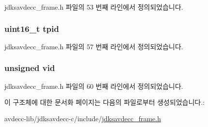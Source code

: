 jdksavdecc\+\_\+frame.\+h 파일의 53 번째 라인에서 정의되었습니다.

\subsubsection[{\texorpdfstring{tpid}{tpid}}]{\setlength{\rightskip}{0pt plus 5cm}uint16\+\_\+t tpid}\hypertarget{structjdksavdecc__frame_a6732d2a618d68a2a54a3be2712852ee9}{}\label{structjdksavdecc__frame_a6732d2a618d68a2a54a3be2712852ee9}


jdksavdecc\+\_\+frame.\+h 파일의 57 번째 라인에서 정의되었습니다.

\subsubsection[{\texorpdfstring{vid}{vid}}]{\setlength{\rightskip}{0pt plus 5cm}unsigned vid}\hypertarget{structjdksavdecc__frame_a139f10af6306ba74259c24567d70c42d}{}\label{structjdksavdecc__frame_a139f10af6306ba74259c24567d70c42d}


jdksavdecc\+\_\+frame.\+h 파일의 60 번째 라인에서 정의되었습니다.



이 구조체에 대한 문서화 페이지는 다음의 파일로부터 생성되었습니다.\+:\begin{DoxyCompactItemize}
\item 
avdecc-\/lib/jdksavdecc-\/c/include/\hyperlink{jdksavdecc__frame_8h}{jdksavdecc\+\_\+frame.\+h}\end{DoxyCompactItemize}
